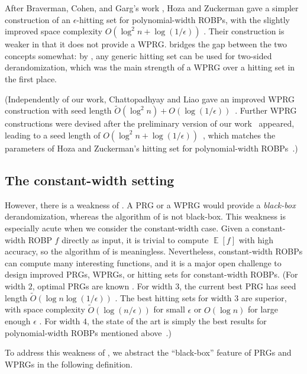\documentclass{toc}
\DeclareMathOperator*{\ExpVal}{\mathbb{E}}
\begin{document}
After Braverman, Cohen, and Garg's work \cite{BCG20}, Hoza and Zuckerman gave a simpler construction of an $\epsilon$-hitting set for polynomial-width ROBPs, with the slightly improved space complexity $O(\log^2 n + \log(1/\epsilon))$ \cite{HZ20}. Their construction is weaker in that it does not provide a WPRG.  bridges the gap between the two concepts somewhat: by , any generic hitting set can be used for two-sided derandomization, which was the main strength of a WPRG over a hitting set in the first place.

(Independently of our work, Chattopadhyay and Liao gave an improved WPRG construction with seed length $\widetilde{O}(\log^2 n) + O(\log(1/\epsilon))$~\cite{CL20}. Further WPRG constructions were devised after the preliminary version of our work~\cite{conf-version} appeared, leading to a seed length of $O(\log^2 n + \log(1/\epsilon))$~\cite{CDRSTS21,PV21,Hoz21}, which matches the parameters of Hoza and Zuckerman's hitting set for polynomial-width ROBPs~\cite{HZ20}.)

\subsection{The constant-width setting}

However, there is a weakness of . A PRG or a WPRG would provide a \emph{black-box} derandomization, whereas the algorithm of  is not black-box. This weakness is especially acute when we consider the constant-width case. Given a constant-width ROBP $f$ directly as input, it is trivial to compute $\ExpVal[f]$ with high accuracy, so the algorithm of  is meaningless. Nevertheless, constant-width ROBPs can compute many interesting functions, and it is a major open challenge to design improved PRGs, WPRGs, or hitting sets for constant-width ROBPs. (For width $2$, optimal PRGs are known \cite{BDVY13}. For width $3$, the current best PRG has seed length $\widetilde{O}(\log n \log(1/\epsilon))$ \cite{MRT19}. The best hitting sets for width $3$ are superior, with space complexity $\widetilde{O}(\log(n/\epsilon))$ for small $\epsilon$ \cite{GMRTV12} or $O(\log n)$ for large enough $\epsilon$ \cite{SZ21}. For width $4$, the state of the art is simply the best results for polynomial-width ROBPs mentioned above~\cite{Nis92,HZ20,Hoz21}.)

To address this weakness of , we abstract the ``black-box'' feature of PRGs and WPRGs in the following definition.
\end{document}

